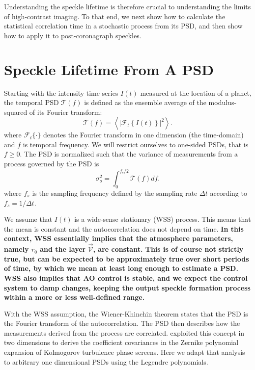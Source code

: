 \documentclass[10pt,preprint]{aastex631}
\begin{document}
Understanding the speckle lifetime is therefore crucial to understanding the limits of high-contrast imaging.  To that end, we next show how to calculate the statistical correlation time in a stochastic process from its PSD, and then show how to apply it to post-coronagraph speckles.


\section{Speckle Lifetime From A PSD}
\label{sec:psd_lifetime}
Starting with the intensity time series $I(t)$ measured at the location of a planet, the temporal PSD $\mathcal{T}(f)$ is defined as the ensemble average of the modulus-squared of its Fourier transform:
\begin{equation}
\mathcal{T}(f) = \left\langle \left| \mathcal{F}_t \left\{ I(t) \right\} \right|^2 \right\rangle.
\label{eqn:psd_def}
\end{equation}
where $\mathcal{F}_t\{\cdot\}$ denotes the Fourier transform in one dimension (the time-domain) and $f$ is temporal frequency.  We will restrict ourselves to one-sided PSDs, that is $f \ge 0$.  The PSD is normalized such that the variance of measurements from a process governed by the PSD is
\begin{equation}
\sigma_o^2 = \int_{0}^{f_s/2} \mathcal{T}(f) df.
\label{eqn:process_var}
\end{equation}
where $f_s$ is the sampling frequency defined by the sampling rate $\Delta t$ according to $f_s = 1/\Delta t$.

We assume that $I(t)$ is a wide-sense stationary (WSS) process.  This means that the mean is constant and the autocorrelation does not depend on time.   \textbf{In this context, WSS essentially implies that the atmosphere parameters, namely $r_0$ and the layer $\vec{\mathcal{V}}$, are constant.  This is of course not strictly true, but can be expected to be approximately true over short periods of time, by which we mean at least long enough to estimate a PSD.  WSS also implies that AO control is stable, and we expect the control system to damp changes, keeping the output speckle formation process within a more or less well-defined range.}

With the WSS assumption, the Wiener-Khinchin theorem states that the PSD is the Fourier transform of the autocorrelation. The PSD then describes how the measurements derived from the process are correlated. \citet{1976JOSA...66..207N} exploited this concept in two dimensions to derive the coefficient covariances in the Zernike polynomial expansion of Kolmogorov turbulence phase screens.  Here we adapt that analysis to arbitrary one dimensional PSDs using the Legendre polynomials.  
\end{document}
